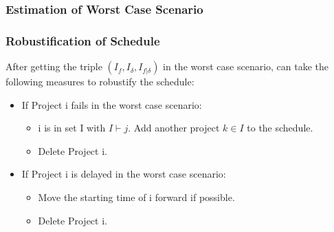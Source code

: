 \documentclass{beamer}
\begin{document}
\begin{frame}
\frametitle{Estimation of Worst Case Scenario}

\begin{algorithm}[H]
	\While{1}{
		\For{i in S, p in $\{Failure, delay, both\}$ with $W_{ip}\leq W$}{
                       
                       
		}
	}       

\end{algorithm} 
\end{frame}


\begin{frame}
\frametitle{Robustification of Schedule}
After getting the triple $(I_f, I_{\delta}, I_{f|\delta})$ in the worst case scenario, can take the following measures to robustify the schedule:
\bigskip
\begin{itemize}
\item If Project i fails in the worst case scenario:
\medskip
	\begin{itemize}
		\item i is  in set I with $I\vdash j$. Add another project $k\in I$ to the schedule. 
\medskip
		\item Delete Project i. 
\medskip
	\end{itemize}
	\item If Project i is delayed in the worst case scenario:
\medskip
	\begin{itemize}
		\item Move the starting time of i forward if possible.
\medskip
		\item Delete Project i. 
	\end{itemize}
\end{itemize}
\end{frame}
\end{document}
